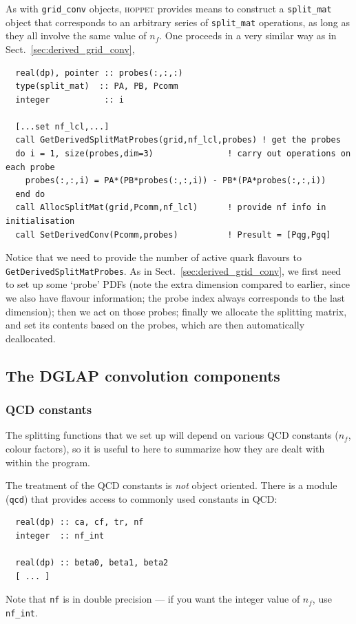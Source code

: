 \documentclass[12pt]{article}
\newcommand{\hoppet}{\textsc{hoppet}\xspace}
\newcommand{\ttt}[1]{\texttt{#1}}
\begin{document}
As with \ttt{grid\_conv} objects, \hoppet provides means to construct
a \ttt{split\_mat} object that corresponds to an arbitrary series of
\ttt{split\_mat} operations, as long as they all involve the same
value of $n_f$. One proceeds in a very similar way as
in Sect.~\ref{sec:derived_grid_conv},
\begin{lstlisting}
  real(dp), pointer :: probes(:,:,:)
  type(split_mat)  :: PA, PB, Pcomm
  integer           :: i

  [...set nf_lcl,...]
  call GetDerivedSplitMatProbes(grid,nf_lcl,probes) ! get the probes
  do i = 1, size(probes,dim=3)               ! carry out operations on each probe
    probes(:,:,i) = PA*(PB*probes(:,:,i)) - PB*(PA*probes(:,:,i))
  end do
  call AllocSplitMat(grid,Pcomm,nf_lcl)      ! provide nf info in initialisation
  call SetDerivedConv(Pcomm,probes)          ! Presult = [Pqg,Pgq]
\end{lstlisting}
Notice that we need to provide the number of active quark flavours
to \ttt{GetDerivedSplitMatProbes}.
As in Sect.~\ref{sec:derived_grid_conv}, we first need to set up
some `probe' PDFs (note the extra dimension compared to earlier, since
we also have flavour information; the probe index always corresponds
to the last dimension); then we act on those probes; finally we
allocate the splitting matrix, and set its contents based on the
probes, which are then automatically deallocated.



\subsection{The DGLAP convolution components}
\label{sec:dglap_holder}

\subsubsection{QCD constants}
\label{sec:qcd}

The splitting functions that we set up will depend on various QCD
constants ($n_f$, colour factors), so it is useful to here to
summarize how they are dealt with within the program.

The treatment of the QCD constants is \emph{not} object oriented.
There is a module (\ttt{qcd}) that provides access to commonly used
constants in QCD:
\begin{lstlisting}
  real(dp) :: ca, cf, tr, nf
  integer  :: nf_int
  
  real(dp) :: beta0, beta1, beta2
  [ ... ]
\end{lstlisting}
Note that \ttt{nf} is in double precision
 --- if you want the integer value of $n_f$, use \ttt{nf\_int}. 
\end{document}
